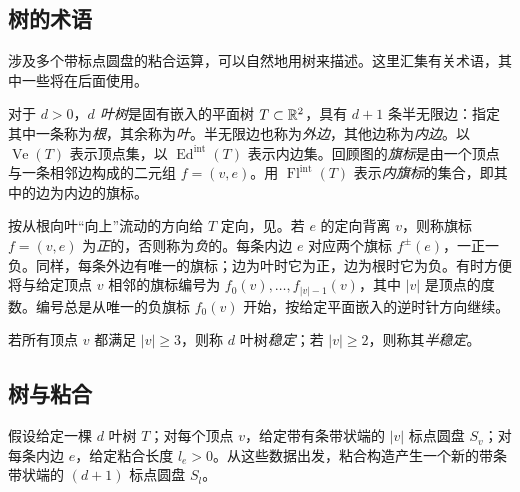 \clearpage
\subsection{树的术语}\label{sec:9d}
涉及多个带标点圆盘的粘合运算，可以自然地用树来描述。这里汇集有关术语，其中一些将在后面使用。
\begin{definition*}
对于 $d>0$，\emph{$d$ 叶树}是固有嵌入的平面树 $T\subset\mathbb R^2$，具有 $d+1$ 条半无限边：指定其中一条称为\emph{根}，其余称为\emph{叶}。半无限边也称为\emph{外边}，其他边称为\emph{内边}。以 $\operatorname{Ve}(T)$ 表示顶点集，以
$\operatorname{Ed}^{\mathrm{int}}(T)$ 表示内边集。回顾图的\emph{旗标}是由一个顶点与一条相邻边构成的二元组 $f=(v,e)$。用 $\operatorname{Fl}^{\mathrm{int}}(T)$ 表示\emph{内旗标}的集合，即其中的边为内边的旗标。

按从根向叶“向上”流动的方向给 $T$ 定向，见。若 $e$ 的定向背离 $v$，则称旗标 $f=(v,e)$ 为\emph{正}的，否则称为\emph{负}的。每条内边 $e$ 对应两个旗标 $f^\pm(e)$，一正一负。同样，每条外边有唯一的旗标；边为叶时它为正，边为根时它为负。有时方便将与给定顶点 $v$ 相邻的旗标编号为 $f_0(v),\ldots,f_{|v|-1}(v)$，其中 $|v|$ 是顶点的度数。编号总是从唯一的负旗标 $f_0(v)$ 开始，按给定平面嵌入的逆时针方向继续。
\end{definition*}
\begin{definition*}
若所有顶点 $v$ 都满足 $|v|\geq3$，则称 $d$ 叶树\emph{稳定}；若 $|v|\geq2$，则称其\emph{半稳定}。
\end{definition*}

\subsection{树与粘合}\label{sec:9e}
假设给定一棵 $d$ 叶树 $T$；对每个顶点 $v$，给定带有条带状端的 $|v|$ 标点圆盘 $S_v$；对每条内边 $e$，给定粘合长度 $l_e>0$。从这些数据出发，粘合构造产生一个新的带条带状端的 $(d+1)$ 标点圆盘 $S_l$。

